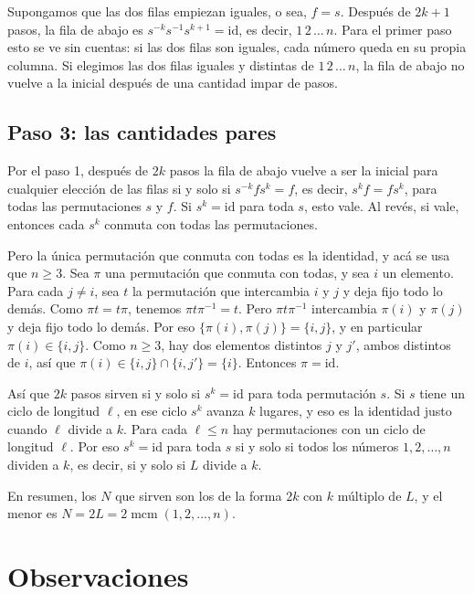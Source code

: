 \documentclass[11pt]{amsproc}
\newcommand{\id}{\mathrm{id}}
\newcommand{\mcm}{\operatorname{mcm}}
\begin{document}
Supongamos que las dos filas empiezan iguales, o sea, $f=s$. Después de
$2k+1$ pasos, la fila de abajo es $s^{-k}s^{-1}s^{k+1}=\id$, es decir,
$1\,2\,\dots\,n$. Para el primer paso esto se ve sin cuentas: si las dos
filas son iguales, cada número queda en su propia columna. Si elegimos las dos filas iguales y
distintas de $1\,2\,\dots\,n$, la fila de abajo no vuelve a la inicial
después de una cantidad impar de pasos.

\subsection*{Paso 3: las cantidades pares}

Por el paso 1, después de $2k$ pasos la fila de abajo vuelve a ser la inicial
para cualquier elección de las filas si y solo si $s^{-k}fs^k=f$, es decir,
$s^kf=fs^k$, para todas las permutaciones $s$ y $f$. Si $s^k=\id$ para toda
$s$, esto vale. Al revés, si vale, entonces cada $s^k$ conmuta con todas las
permutaciones.

Pero la única permutación que conmuta con todas es la identidad, y acá se usa
que $n\ge 3$. Sea $\pi$ una permutación que conmuta con todas, y sea $i$ un
elemento. Para cada $j\ne i$, sea $t$ la permutación que intercambia $i$ y
$j$ y deja fijo todo lo demás. Como $\pi t=t\pi$, tenemos $\pi t\pi^{-1}=t$.
Pero $\pi t\pi^{-1}$ intercambia $\pi(i)$ y $\pi(j)$ y deja fijo todo lo
demás. Por eso $\{\pi(i),\pi(j)\}=\{i,j\}$, y en particular
$\pi(i)\in\{i,j\}$. Como $n\ge 3$, hay dos elementos distintos $j$ y $j'$,
ambos distintos de $i$, así que $\pi(i)\in\{i,j\}\cap\{i,j'\}=\{i\}$.
Entonces $\pi=\id$.

Así que $2k$ pasos sirven si y solo si $s^k=\id$ para toda permutación $s$.
Si $s$ tiene un ciclo de longitud $\ell$, en ese ciclo $s^k$ avanza $k$
lugares, y eso es la identidad justo cuando $\ell$ divide a $k$. Para cada
$\ell\le n$ hay permutaciones con un ciclo de longitud $\ell$. Por eso
$s^k=\id$ para toda $s$ si y solo si todos los números $1,2,\dots,n$ dividen
a $k$, es decir, si y solo si $L$ divide a $k$.

En resumen, los $N$ que sirven son los de la forma $2k$ con $k$ múltiplo de
$L$, y el menor es $N=2L=2\mcm(1,2,\dots,n)$.

\section*{Observaciones}
\end{document}
